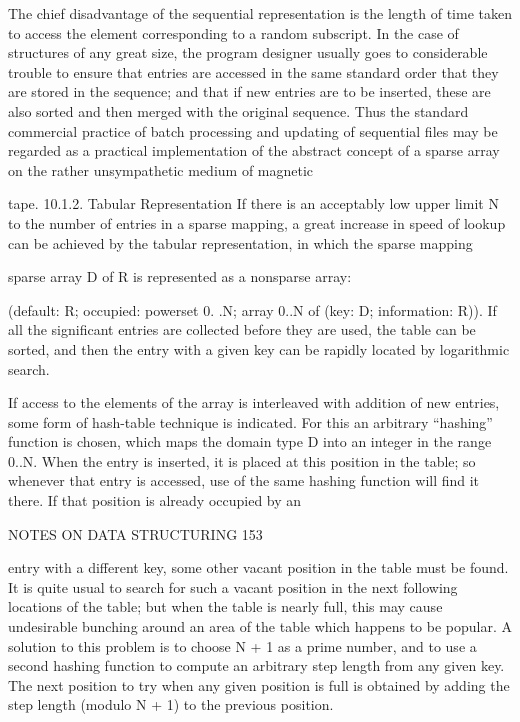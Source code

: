 {{		The chief disadvantage of the sequential representation is the length of time taken to access the element corresponding to a random subscript. In the case of structures of any great size, the program designer usually goes to considerable trouble to ensure that entries are accessed in the same standard order that they are stored in the sequence; and that if new entries are to be inserted, these are also sorted and then merged with the original sequence. Thus the standard commercial practice of batch processing and updating of sequential files may be regarded as a practical implementation of the abstract concept of a sparse array on the rather unsympathetic medium of magnetic
		
		tape. 10.1.2. Tabular Representation If there is an acceptably low upper limit N to the number of entries in a sparse mapping, a great increase in speed of lookup can be achieved by the tabular representation, in which the sparse mapping
		
		sparse array D of R is represented as a nonsparse array:
		
		(default: R; occupied: powerset 0. .N; array 0..N of (key: D; information: R)). If all the significant entries are collected before they are used, the table can be sorted, and then the entry with a given key can be rapidly located by logarithmic search.
		
		If access to the elements of the array is interleaved with addition of new entries, some form of hash-table technique is indicated. For this an arbitrary “hashing” function is chosen, which maps the domain type D into an integer in the range 0..N. When the entry is inserted, it is placed at this position in the table; so whenever that entry is accessed, use of the same hashing function will find it there. If that position is already occupied by an
		
		NOTES ON DATA STRUCTURING 153
		
		entry with a different key, some other vacant position in the table must be found. It is quite usual to search for such a vacant position in the next following locations of the table; but when the table is nearly full, this may cause undesirable bunching around an area of the table which happens to be popular. A solution to this problem is to choose N + 1 as a prime number, and to use a second hashing function to compute an arbitrary step length from any given key. The next position to try when any given position is full is obtained by adding the step length (modulo N + 1) to the previous position.
		
}}
